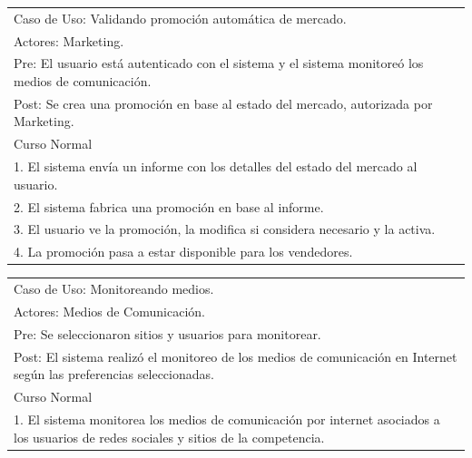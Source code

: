 \vspace{1cm}

\begin{tabular}{ | p{14cm} | }
  \hline
  Caso de Uso: Validando promoción automática de mercado. \\
  Actores: Marketing. \\
  Pre: El usuario está autenticado con el sistema y el sistema monitoreó los medios de comunicación. \\
  Post: Se crea una promoción en base al estado del mercado, autorizada por Marketing. \\
  \hline
  Curso Normal\\
  \hline
  1. El sistema envía un informe con los detalles del estado del mercado al usuario. \\
  2. El sistema fabrica una promoción en base al informe. \\
  3. El usuario ve la promoción, la modifica si considera necesario y la activa. \\
  4. La promoción pasa a estar disponible para los vendedores. \\
  \hline
\end{tabular}

\vspace{1cm}

\begin{tabular}{ | p{14cm} | }
  \hline
  Caso de Uso: Monitoreando medios.\\
  Actores: Medios de Comunicación. \\
  Pre: Se seleccionaron sitios y usuarios para monitorear. \\
  Post: El sistema realizó el monitoreo de los medios de comunicación en Internet según las preferencias seleccionadas. \\
  \hline
  Curso Normal\\
  \hline
  1. El sistema monitorea los medios de comunicación por internet asociados a los usuarios de redes sociales y sitios de la competencia. \\
  \hline
\end{tabular}
